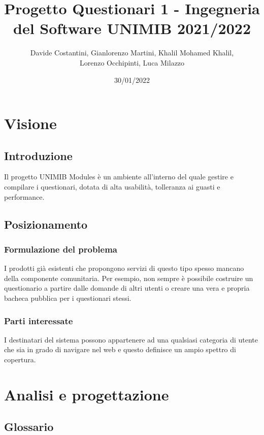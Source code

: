 \documentclass[12pt]{article}
\title{ Progetto Questionari 1 - Ingegneria del Software  UNIMIB 2021/2022} %
\author{Davide Costantini, Gianlorenzo Martini, Khalil Mohamed Khalil, \\ Lorenzo Occhipinti, Luca Milazzo} %
\date{30/01/2022} %
\begin{document}
\maketitle %
\newpage
\tableofcontents \newpage
\section{Visione}
\subsection{Introduzione}
Il progetto UNIMIB Modules è un ambiente all'interno del quale gestire e compilare i questionari, dotata di alta usabilità, tolleranza ai guasti e performance.
\subsection{Posizionamento}
\subsubsection{Formulazione del problema}
I prodotti già esistenti che propongono servizi di questo tipo spesso mancano della componente comunitaria. Per esempio, non sempre è possibile costruire un questionario a partire dalle domande di altri utenti o creare una vera e propria bacheca pubblica per i questionari stessi.
\subsubsection{Parti interessate}
I destinatari del sistema possono appartenere ad una qualsiasi categoria di utente che sia in grado di navigare nel web e questo definisce un ampio spettro di copertura.

\section{Analisi e progettazione}
\subsection{Glossario}
\end{document}
